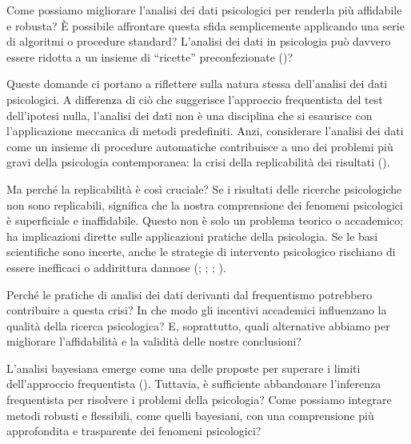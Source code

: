 \documentclass[
  letterpaper,
  DIV=11,
  numbers=noendperiod]{scrreprt}
\theoremstyle{definition}
\theoremstyle{remark}
\begin{document}

Come possiamo migliorare l'analisi dei dati psicologici per renderla più
affidabile e robusta? È possibile affrontare questa sfida semplicemente
applicando una serie di algoritmi o procedure standard? L'analisi dei
dati in psicologia può davvero essere ridotta a un insieme di
``ricette'' preconfezionate
()?

Queste domande ci portano a riflettere sulla natura stessa dell'analisi
dei dati psicologici. A differenza di ciò che suggerisce l'approccio
frequentista del test dell'ipotesi nulla, l'analisi dei dati non è una
disciplina che si esaurisce con l'applicazione meccanica di metodi
predefiniti. Anzi, considerare l'analisi dei dati come un insieme di
procedure automatiche contribuisce a uno dei problemi più gravi della
psicologia contemporanea: la crisi della replicabilità dei risultati
().

Ma perché la replicabilità è così cruciale? Se i risultati delle
ricerche psicologiche non sono replicabili, significa che la nostra
comprensione dei fenomeni psicologici è superficiale e inaffidabile.
Questo non è solo un problema teorico o accademico; ha implicazioni
dirette sulle applicazioni pratiche della psicologia. Se le basi
scientifiche sono incerte, anche le strategie di intervento psicologico
rischiano di essere inefficaci o addirittura dannose
(;
;
;
).

Perché le pratiche di analisi dei dati derivanti dal frequentismo
potrebbero contribuire a questa crisi? In che modo gli incentivi
accademici influenzano la qualità della ricerca psicologica? E,
soprattutto, quali alternative abbiamo per migliorare l'affidabilità e
la validità delle nostre conclusioni?

L'analisi bayesiana emerge come una delle proposte per superare i limiti
dell'approccio frequentista (). Tuttavia, è sufficiente abbandonare l'inferenza
frequentista per risolvere i problemi della psicologia? Come possiamo
integrare metodi robusti e flessibili, come quelli bayesiani, con una
comprensione più approfondita e trasparente dei fenomeni psicologici?
\end{document}
